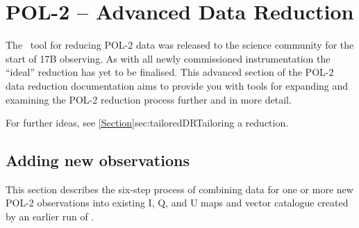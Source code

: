 \chapter{POL-2 -- Advanced Data Reduction}
\label{sec:advanced}


The \poltwomap\ tool for reducing POL-2 data was released to the science
community for the start of 17B observing. As with all newly
commissioned instrumentation the ``ideal'' reduction has yet to be
finalised. This advanced section of the POL-2 data reduction
documentation aims to provide you with tools for
expanding and examining the POL-2 reduction process further and in
more detail.

For further ideas, see \cref{Section}{sec:tailoredDR}{Tailoring a reduction}.

\section{Adding new observations}

This section describes the six-step process of combining data for one
or more new POL-2 observations into existing I, Q, and U maps and vector
catalogue created by an earlier run of .

